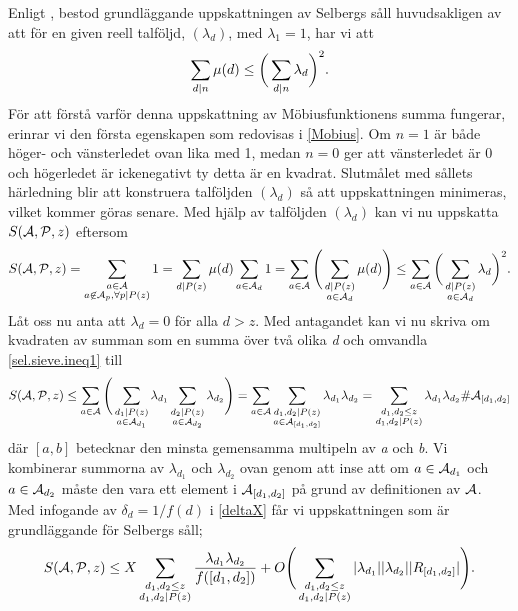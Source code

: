 Enligt \cite[s. 114]{cojocarumurty}, bestod grundläggande uppskattningen av Selbergs såll huvudsakligen av att för en given reell talföljd, \((\lambda_d)\), med \(\lambda_1 = 1\), har vi att 
\begin{equation}
    \sum_{d\divides n}\mu(d) \leq \bigg(\sum_{d\divides n}\lambda_d\bigg)^2.\nonumber
\end{equation}
För att förstå varför denna uppskattning av Möbiusfunktionens summa fungerar, erinrar vi den första egenskapen som redovisas i \ref{Mobius}. 
Om \(n=1\) är både höger- och vänsterledet ovan lika med 1, medan \(n=0\) ger att vänsterledet är 0 och högerledet är ickenegativt ty detta är en kvadrat.
Slutmålet med sållets härledning blir att konstruera talföljden \((\lambda_d)\) så att uppskattningen minimeras, vilket kommer göras senare.
Med hjälp av talföljden \((\lambda_d)\) kan vi nu uppskatta \(\S{A}{P}{z}\) eftersom
\begin{equation}
\S{A}{P}{z} = \sum_{\substack{a\in \mathcal{A}\\a\not\in\mathcal{A}_p,\forall p\divides P(z)}} 1 = \sum_{d\divides P(z)} \mu(d) \sum_{a\in\mathcal{A}_d}1 = \sum_{a\in \A} \Bigg(\sum_{\substack{d\divides P(z)\\a\in \A_d}}\mu(d)\Bigg)\leq \sum_{a\in \A}\bigg(\sum_{\substack{d\divides P(z)\\a\in \A_d}}\lambda_d\bigg)^2.\label{sel.sieve.ineq1}
\end{equation}
Låt oss nu anta att \(\lambda_d = 0\) för alla \(d > z\). Med antagandet kan vi nu skriva om kvadraten av summan som en summa över två olika \textit{d} och omvandla \eqref{sel.sieve.ineq1} till
\begin{equation}
    \S{A}{P}{z} \leq \sum_{a\in \A}\Bigg(\sum_{\substack{d_1\divides P(z)\\a\in \A_{d_1}}}\lambda_{d_1}\sum_{\substack{d_2\divides P(z)\\a\in \A_{d_2}}}\lambda_{d_2}\Bigg)  =  \sum_{a\in \A}\sum_{\substack{d_1,d_2\divides P(z)\\a\in \A_{[d_1,d_2]}}}\lambda_{d_1}\lambda_{d_2} = \sum_{\substack{d_1,d_2\leq z\\d_1,d_2\divides P(z)}}\lambda_{d_1}\lambda_{d_2}\#\A_{[d_1, d_2]}\nonumber
\end{equation}
där \([a, b]\) betecknar den minsta gemensamma multipeln av \textit{a} och \textit{b}. 
Vi kombinerar summorna av \(\lambda_{d_1}\) och \(\lambda_{d_2}\) ovan genom att inse att om \(a\in\A_{d_1}\) och \(a\in\A_{d_2}\) måste den vara ett element i \(\A_{[d_1,d_2]}\) på grund av definitionen av \(\A\).
Med infogande av \(\delta_d = 1/f(d)\) i \eqref{deltaX} får vi uppskattningen som är grundläggande för Selbergs såll;
\begin{equation}
    \S{A}{P}{z} \leq X\sum_{\substack{d_1,d_2\leq z\\d_1,d_2\divides P(z)}}\frac{\lambda_{d_1}\lambda_{d_2}}{f([d_1,d_2])} + O\Bigg(\sum_{\substack{d_1,d_2\leq z\\d_1,d_2\divides P(z)}}|\lambda_{d_1}||\lambda_{d_2}||R_{[d_1, d_2]}|\Bigg)\label{sel.sieve.main}.
\end{equation}

